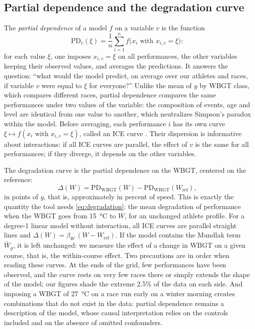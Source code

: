 \documentclass[11pt,a4paper]{article}
\newcommand{\WBGT}{\mathrm{WBGT}}
\begin{document}
\subsection{Partial dependence and the degradation curve}\label{sec:pd}

The \emph{partial dependence} of a model $f$ on a variable $v$ \citep{friedman2001} is the function
\[
\mathrm{PD}_v(\xi) = \frac1n\sum_{i=1}^n f\big(x_i \text{ with } x_{i,v} = \xi\big):
\]
for each value $\xi$, one imposes $x_{i,v} = \xi$ on all performances, the other variables keeping their observed
values, and averages the predictions. It answers the question: ``what would the model predict, on average over our
athletes and races, if variable $v$ were equal to $\xi$ for everyone?'' Unlike the mean of $y$ by WBGT class, which
compares different races, partial dependence compares the same performances under two values of the variable: the
composition of events, age and level are identical from one value to another, which neutralizes Simpson's paradox
within the model. Before averaging, each performance $i$ has its own curve
$\xi \mapsto f(x_i \text{ with } x_{i,v} = \xi)$, called an ICE curve \citep{goldstein2015}. Their dispersion is
informative about interactions: if all ICE curves are parallel, the effect of $v$ is the same for all performances; if
they diverge, it depends on the other variables.

The degradation curve is the partial dependence on the WBGT, centered on the reference:
\begin{equation}\label{eq:degradation_curve}
\Delta(W) = \mathrm{PD}_{\WBGT}(W) - \mathrm{PD}_{\WBGT}(W_{\text{ref}}),
\end{equation}
in points of $y$, that is, approximately in percent of speed. This is exactly the quantity the tool needs
\eqref{eq:degradation}: the mean degradation of performance when the WBGT goes from 15~°C to $W$, for an unchanged
athlete profile. For a degree-1 linear model without interaction, all ICE curves are parallel straight lines and
$\Delta(W) = \beta_W\,(W - W_{\text{ref}})$. If the model contains the Mundlak term $\bar W_g$, it is left unchanged:
we measure the effect of a change in WBGT on a given course, that is, the within-course effect. Two precautions are in
order when reading these curves. At the ends of the grid, few performances have been observed, and the curve rests on
very few races there or simply extends the shape of the model; our figures shade the extreme 2.5\% of the data on each
side. And imposing a WBGT of 27~°C on a race run early on a winter morning creates combinations that do not exist in
the data: partial dependence remains a description of the model, whose causal interpretation relies on the controls
included and on the absence of omitted confounders.
\end{document}
